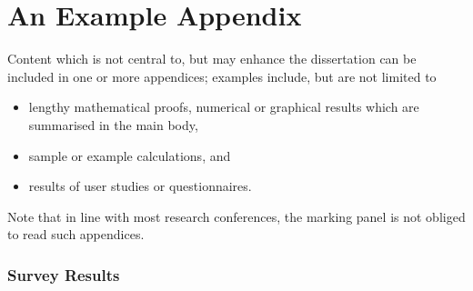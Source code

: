 \documentclass[ %
                    author={Jonathan Rankin},
                supervisor={Dr. David May, Dr. Ian Holyer},
                    degree={MEng},
                     title={CodeTouch},
                  subtitle={A Revolutionary Way To Program Real Code On Touch Screen Devices},
                      type={enterprise},
                      year={2015 } ]{dissertation}
\begin{document}

%
%

\backmatter






\appendix

\chapter{An Example Appendix}
\label{appx:example}



Content which is not central to, but may enhance the dissertation can
be included in one or more appendices; examples include, but are not 
limited to

\begin{itemize}
\item lengthy mathematical proofs, numerical or graphical results
      which are summarised in the main body,
\item sample or example calculations, 
      and
\item results of user studies or questionnaires.
\end{itemize}


\noindent
Note that in line with most research conferences, the marking panel 
is not obliged to read such appendices.

\subsection{Survey Results}
\label{ssec:survey}

\end{document}
